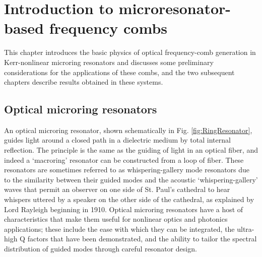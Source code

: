 \chapter{Introduction to microresonator-based frequency combs}
 \label{ch:microresonators}
 
 This chapter introduces the basic physics of  optical frequency-comb generation in Kerr-nonlinear microring resonators and discusses some preliminary considerations for the applications of these combs, and the two  subsequent chapters describe results obtained in these systems.
 
 \section{Optical microring resonators}
An optical microring resonator, shown schematically in Fig. \ref{fig:RingResonator}, guides light around a closed path in a dielectric medium by total internal reflection. The principle is the same as the guiding of light in an optical fiber, and indeed a `macroring' resonator can be constructed from a loop of fiber. These resonators are sometimes referred to as whispering-gallery mode resonators due to the similarity between their guided modes and the acoustic `whispering-gallery' waves that permit an observer on one side of St. Paul's cathedral to hear whispers uttered by a speaker on the other side of the cathedral, as explained by Lord Rayleigh beginning in 1910. Optical microring resonators have a host of characteristics that make them useful for nonlinear optics and photonics applications; these include the ease with which they can be integrated, the ultra-high Q factors that have been demonstrated, and the ability to tailor the spectral distribution of guided modes through careful resonator design.  


